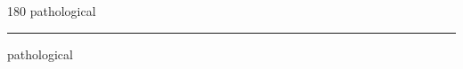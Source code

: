
\begin{frame}
\begin{center}
\begin{turn}{180}
{\fontsize{2.5cm}{1em}\selectfont pathological}
\end{turn}
\vspace{1em}\par  
\hrule
\vspace{1em}\par  
{\fontsize{2.5cm}{1em}\selectfont pathological}
\end{center}
\end{frame}
